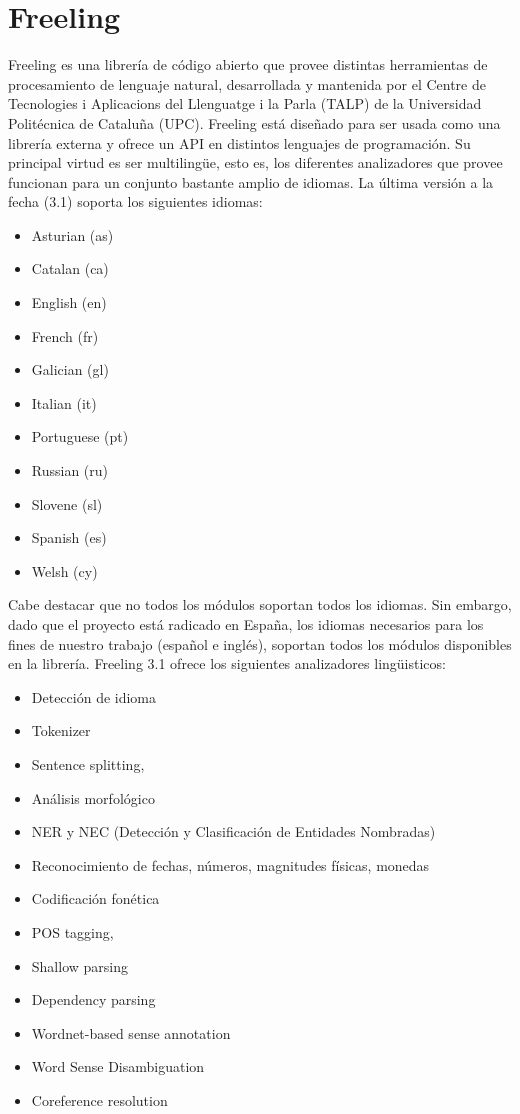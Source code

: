 \section{Freeling}

Freeling es una librer\'ia de c\'odigo abierto que provee distintas herramientas de 
procesamiento de lenguaje natural, desarrollada y mantenida por el Centre de Tecnologies 
i Aplicacions del Llenguatge i la Parla (TALP) de la Universidad Polit\'ecnica de Catalu\~na (UPC). 
Freeling est\'a dise\~nado para ser usada como una librer\'ia externa y ofrece un API en distintos lenguajes
de programaci\'on. Su principal virtud es ser multilingüe, esto es, los diferentes analizadores que provee funcionan 
para un conjunto bastante amplio de idiomas. La \'ultima versi\'on a la fecha (3.1) soporta los siguientes idiomas:

\begin{itemize}
\item Asturian (as)
\item Catalan (ca) 
\item English (en)
\item French (fr) 
\item Galician (gl)
\item Italian (it)
\item Portuguese (pt)
\item Russian (ru)
\item Slovene (sl)
\item Spanish (es)
\item Welsh (cy)
\end{itemize}

Cabe destacar que no todos los m\'odulos soportan todos los idiomas. Sin embargo, dado que el proyecto est\'a radicado en Espa\~na,
los idiomas necesarios para los fines de nuestro trabajo (espa\~nol e ingl\'es), soportan todos los m\'odulos disponibles
en la librer\'ia.
Freeling 3.1 ofrece los siguientes analizadores lingüisticos:

\begin{itemize}
\item Detecci\'on de idioma
\item Tokenizer
\item Sentence splitting,
\item An\'alisis morfol\'ogico
\item NER y NEC (Detecci\'on y Clasificaci\'on de Entidades Nombradas)
\item Reconocimiento de fechas, n\'umeros, magnitudes f\'isicas, monedas
\item Codificaci\'on fon\'etica
\item POS tagging, 
\item Shallow parsing
\item Dependency parsing
\item Wordnet-based sense annotation
\item Word Sense Disambiguation
\item Coreference resolution
\end{itemize}



